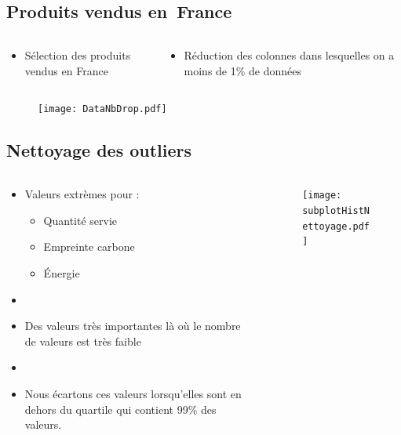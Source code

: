   \subsection{Produits vendus en France}
    \begin{frame}{\insertsubsection}
      \begin{columns}
        \begin{column}{.5\textwidth}
          \begin{itemize}
            \item Sélection des produits vendus en France
          \end{itemize}
        \end{column}
        \begin{column}{.5\textwidth}
          \begin{itemize}
            \item Réduction des colonnes dans lesquelles on a moins de 1\% de données
          \end{itemize}
        \end{column}
      \end{columns}
      \begin{figure}
        \texttt{[image: DataNbDrop.pdf]}
      \end{figure}
    \end{frame}
  
  \subsection{Nettoyage des outliers}
    \begin{frame}{\insertsubsection}
      \begin{columns}
        \begin{column}{.3\textwidth}
          \begin{itemize}
            \item Valeurs extrèmes pour :
            \begin{itemize}
              \item Quantité servie
              \item Empreinte carbone
              \item Énergie
            \end{itemize}
            \item[]
            \item Des valeurs très importantes là où le nombre de valeurs est très faible
            \item[]
            \item Nous écartons ces valeurs lorsqu'elles sont en dehors du quartile qui contient 99\% des valeurs. 
          \end{itemize}
        \end{column}
        \begin{column}{.7\textwidth}
          \begin{figure}
            \texttt{[image: subplotHistNettoyage.pdf]}
          \end{figure}  
        \end{column}        
      \end{columns}
    \end{frame}

